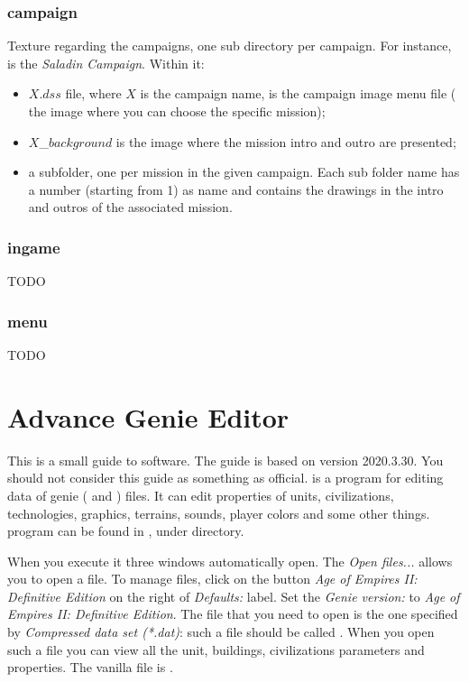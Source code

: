 \begin{appendices}
    \subsection{campaign}

    Texture regarding the campaigns, one sub directory per campaign. For instance,  is the \textit{Saladin Campaign}. Within it:
    \begin{itemize}
        \item $X.dss$ file, where $X$ is the campaign name, is the campaign image menu file (\ie{} the image where you can choose the specific mission);
        \item $X$\_$background$ is the image where the mission intro and outro are presented;
        \item a subfolder, one per mission in the given campaign. Each sub folder name has a number (starting from 1) as name and contains the drawings in the intro and outros of the associated mission.
    \end{itemize}

    \subsection{ingame}

    TODO

    \subsection{menu}

    TODO


    \chapter{Advance Genie Editor}
    \label{chp:genieeditor}

    This is a small guide to \genie{} software. The guide is based on version 2020.3.30. You should not consider this guide as something as official. \genie{} is a program for editing data of genie ( and ) files. It can edit properties of units, civilizations, technologies, graphics, terrains, sounds, player colors and some other things\cite{TurnupHyperion4:2019}.
    \genie{} program can be found in \aoeexedir{}, under  directory.

    When you execute it three windows automatically open. The \textit{Open files...} allows you to open a \genie{} file. To manage \aoe{} files, click on the button \textit{Age of Empires II: Definitive Edition} on the right of \textit{Defaults:} label. Set the \textit{Genie version:} to \textit{Age of Empires II: Definitive Edition}.
    The file that you need to open is the one specified by \textit{Compressed data set (*.dat)}: such a file should be called . When you open such a file you can view all the unit, buildings, civilizations parameters and properties. The vanilla file is .


\end{appendices}

